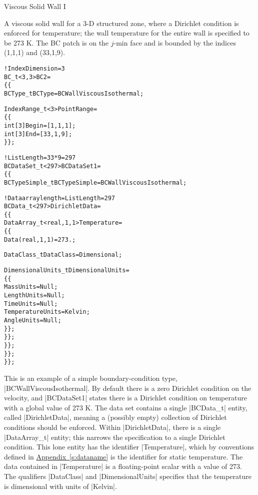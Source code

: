 \begin{example}{Viscous Solid Wall I}
\label{ex:bc2}

A viscous solid wall for a 3-D structured zone, where a Dirichlet
condition is enforced for temperature; the wall temperature for the
entire wall is specified to be 273 K.
The BC patch is on the $j$-min face and is bounded by the indices
(1,1,1) and (33,1,9).
\begin{alltt}
  !  IndexDimension = 3
  BC\_t<3,3> BC2 =
    \{\{
    BCType\_t BCType = BCWallViscousIsothermal ;

    IndexRange\_t<3> PointRange =
      \{\{
      int[3] Begin = [1 ,1,1] ;
      int[3] End   = [33,1,9] ;
      \}\} ;

    !  ListLength = 33*9 = 297
    BCDataSet\_t<297> BCDataSet1 =
      \{\{
      BCTypeSimple\_t BCTypeSimple = BCWallViscousIsothermal ;

      !  Data array length = ListLength = 297
      BCData\_t<297> DirichletData =
        \{\{
        DataArray\_t<real, 1, 1> Temperature =
          \{\{
          Data(real, 1, 1) = 273. ;
          
          DataClass\_t DataClass = Dimensional ;

          DimensionalUnits\_t DimensionalUnits = 
            \{\{
            MassUnits        = Null ;
            LengthUnits      = Null ;
            TimeUnits        = Null ;
            TemperatureUnits = Kelvin ;
            AngleUnits       = Null ;
            \}\} ;
          \}\} ;
        \}\} ;
      \}\} ;
    \}\} ;
\end{alltt}

This is an example of a simple boundary-condition type,
|BCWallViscousIsothermal|.
By default there is a zero Dirichlet condition on the velocity, and
|BCDataSet1| states there is a Dirichlet condition on temperature with a
global value of 273 K.
The data set contains a single |BCData_t| entity, called
|DirichletData|, meaning a (possibly empty) collection of Dirichlet
conditions should be enforced.
Within |DirichletData|, there is a single |DataArray_t| entity; this
narrows the specification to a single Dirichlet condition.
This lone entity has the identifier |Temperature|, which by conventions
defined in \hyperref[s:dataname]{Appendix~\ref*{s:dataname}} is the
identifier for static temperature.
The data contained in |Temperature| is a floating-point scalar with a
value of 273.
The qualifiers |DataClass| and |DimensionalUnits| specifies that the
temperature is dimensional with units of |Kelvin|.


\end{example}

